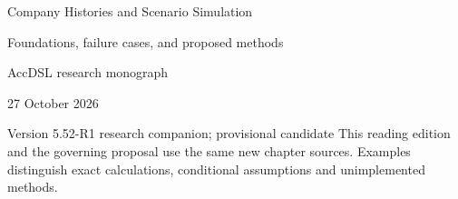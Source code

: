 \documentclass[11pt,a4paper]{report}
\begin{document}
\hypersetup{pageanchor=false}
\begin{titlepage}
{\Huge Company Histories and Scenario Simulation\par}
\vspace{12mm}
{\Large Foundations, failure cases, and proposed methods\par}
\vspace{8mm}
AccDSL research monograph\par 27 October 2026\par Version 5.52-R1 research companion; provisional candidate
\vfill
This reading edition and the governing proposal use the same new chapter sources. Examples distinguish exact calculations, conditional assumptions and unimplemented methods.
\end{titlepage}
\hypersetup{pageanchor=true}
\tableofcontents
\clearpage{}


























\clearpage\label{sim:body-end}

\begingroup\raggedright
\endgroup
\end{document}

